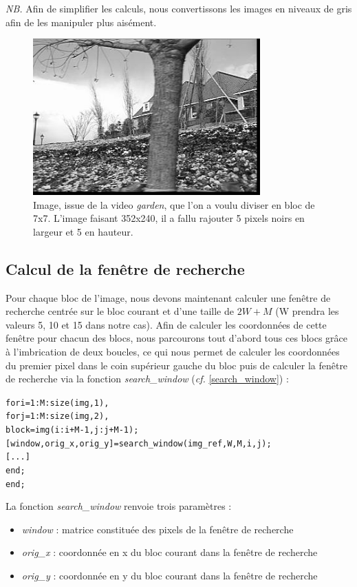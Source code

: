 \documentclass[a4paper, 12pt]{article}
\begin{document}
\textit{NB.} Afin de simplifier les calculs, nous convertissons les images en niveaux de gris afin de les manipuler plus aisément.

\begin{figure}[H]
	\centering
		\includegraphics[height=6cm]{../Resultats/Garden/garden_padding.jpg}
	\caption{Image, issue de la video \textit{garden}, que l'on a voulu diviser en bloc de 7x7. L'image faisant 352x240, il a fallu rajouter 5 pixels noirs en largeur et 5 en hauteur.}
	\label{fig:padding}
\end{figure}

\subsection{Calcul de la fenêtre de recherche}

Pour chaque bloc de l'image, nous devons maintenant calculer une fenêtre de recherche centrée sur le bloc courant et d'une taille de $2W+M$ (W prendra les valeurs 5, 10 et 15 dans notre cas). Afin de calculer les coordonnées de cette fenêtre pour chacun des blocs, nous parcourons tout d'abord tous ces blocs grâce à l'imbrication de deux boucles, ce qui nous permet de calculer les coordonnées du premier pixel dans le coin supérieur gauche du bloc puis de calculer la fenêtre de recherche via la fonction \textit{search\_window} (\textit{cf.} \ref{search_window}) :
\begin{alltt} 
for i=1:M:size(img,1), 
	for j=1:M:size(img,2),
		block = img(i:i+M-1,j:j+M-1);
		[window, orig_x, orig_y] = search_window(img_ref,W,M,i,j);
		[...]
	end;
end;
\end{alltt}

La fonction \textit{search\_window} renvoie trois paramètres : 
\begin{itemize}
  \item \textit{window} : matrice constituée des pixels de la fenêtre de recherche
  \item \textit{orig\_x} : coordonnée en x du bloc courant dans la fenêtre de recherche
  \item \textit{orig\_y} : coordonnée en y du bloc courant dans la fenêtre de recherche
\end{itemize}
\end{document}
